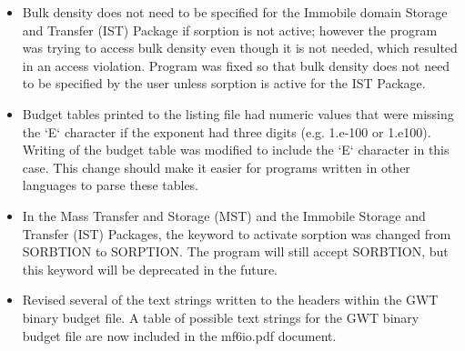 \begin{itemize}
	        \item Bulk density does not need to be specified for the Immobile domain Storage and Transfer (IST) Package if sorption is not active; however the program was trying to access bulk density even though it is not needed, which resulted in an access violation.  Program was fixed so that bulk density does not need to be specified by the user unless sorption is active for the IST Package.
	        \item Budget tables printed to the listing file had numeric values that were missing the `E` character if the exponent had three digits (e.g. 1.e-100 or 1.e100).  Writing of the budget table was modified to include the `E` character in this case.  This change should make it easier for programs written in other languages to parse these tables.
	        \item In the Mass Transfer and Storage (MST) and the Immobile Storage and Transfer (IST) Packages, the keyword to activate sorption was changed from SORBTION to SORPTION.  The program will still accept SORBTION, but this keyword will be deprecated in the future.
	        \item Revised several of the text strings written to the headers within the GWT binary budget file.  A table of possible text strings for the GWT binary budget file are now included in the mf6io.pdf document.
	\end{itemize}


